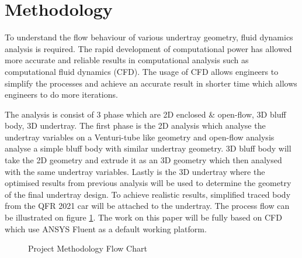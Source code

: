 \section{Methodology}
To understand the flow behaviour of various undertray geometry, fluid dynamics analysis is required. The rapid development of computational power has allowed more accurate and reliable results in computational analysis such as computational fluid dynamics (CFD)\cite{Andersson2011ComputationalEngineers}. The usage of CFD allows engineers to simplify the processes and achieve an accurate result in shorter time which allows engineers to do more iterations. 

\noindent The analysis is consist of 3 phase which are 2D enclosed \& open-flow, 3D bluff body, 3D undertray. The first phase is the 2D analysis which analyse the undertray variables on a Venturi-tube like geometry and open-flow analysis analyse a simple bluff body with similar undertray geometry. 3D bluff body will take the 2D geometry and extrude it as an 3D geometry which then analysed with the same undertray variables. Lastly is the 3D undertray where the optimised results from previous analysis will be used to determine the geometry of the final undertray design. To achieve realistic results, simplified traced body from the QFR 2021 car will be attached to the undertray. The process flow can be illustrated on figure \ref{fig:project methodology}. The work on this paper will be fully based on CFD which use ANSYS Fluent as a default working platform.

\begin{figure}[ht!]
    \centering
    \caption{Project Methodology Flow Chart}
    \label{fig:project methodology}
\end{figure}


